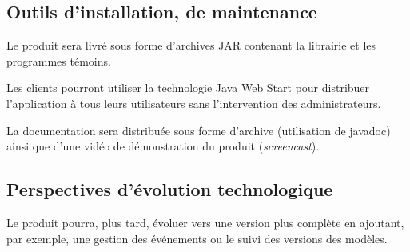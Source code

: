 \subsection{Outils d’installation, de maintenance}

Le produit sera livré sous forme d'archives JAR contenant la librairie et les programmes témoins.

Les clients pourront utiliser la technologie Java Web Start pour distribuer l'application à tous leurs utilisateurs sans l'intervention des administrateurs.

La documentation sera distribuée sous forme d'archive (utilisation de javadoc) ainsi que d'une vidéo de démonstration du produit (\emph{screencast}).

\subsection{Perspectives d’évolution technologique}

Le produit pourra, plus tard, évoluer vers une version plus complète en ajoutant, par exemple, une gestion des événements ou le suivi des versions des modèles.